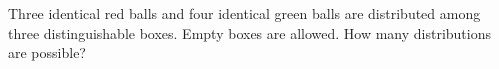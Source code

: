 Three identical red balls and four identical green balls are distributed among three distinguishable boxes. Empty boxes are allowed. How many distributions are possible?
